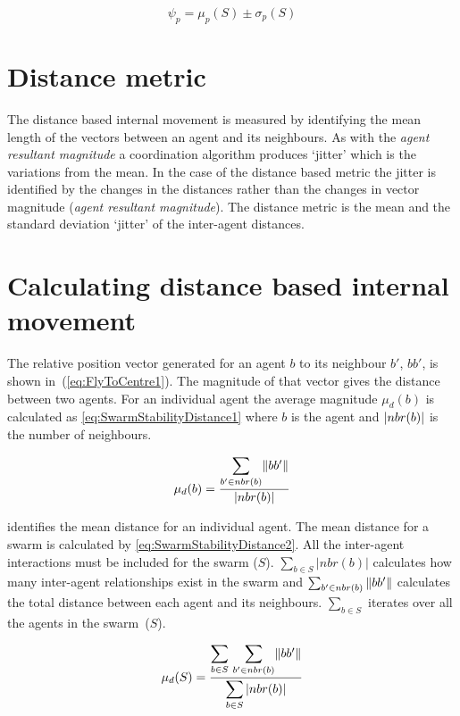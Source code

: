 \begin{equation}
\label{eq:SwarmPotentialMagnitude}
\psi_p = \mu_p(S)\pm \sigma_p(S)
\end{equation}

\section{Distance metric}
The distance based internal movement is measured by identifying the mean length of the vectors between an agent and its neighbours. As with the \textit{agent resultant magnitude} a coordination algorithm produces `jitter' which is the variations from the mean. In the case of the distance based metric the jitter is identified by the changes in the distances rather than the changes in vector magnitude (\textit{agent resultant magnitude}). The distance metric is the mean and the standard deviation `jitter' of the inter-agent distances.

\section{Calculating distance based internal movement}
The relative position vector generated for an agent $b$ to its neighbour $b'$, $bb'$, is shown in~(\autoref{eq:FlyToCentre1}). The magnitude of that vector gives the distance between two agents. For an individual agent the average magnitude $\mu_d(b)$ is calculated as \autoref{eq:SwarmStabilityDistance1} where $b$ is the agent and $\vert{nbr(b)}\vert$ is the number of neighbours.

\begin{equation}
\label{eq:SwarmStabilityDistance1}
\mu_d(b) = \frac{\mathlarger{\sum_{b' \in nbr(b)}}\magn{bb'}}{\mathlarger{\card{nbr(b)}}}
\end{equation}

\label{eq:SwarmStabilityDistance1} identifies the mean distance for an individual agent. The mean distance for a swarm is calculated by \autoref{eq:SwarmStabilityDistance2}. All the inter-agent interactions must be included for the swarm ($S$). $\sum_{b \in S}|nbr(b)|$ calculates how many inter-agent relationships exist in the swarm and $\sum_{b' \in nbr(b)}\Vert{bb'}\Vert$ calculates the total distance between each agent and its neighbours. $\sum_{b \in S}$ iterates over all the agents in the swarm~($S$).

\begin{equation}
\label{eq:SwarmStabilityDistance2}
\mu_d(S) = \frac{\mathlarger{\sum_{b \in S}}~\mathlarger{\sum_{b' \in nbr(b)}}\magn{bb'}}{\mathlarger{\sum_{b \in S}\card{nbr(b)}}}
\end{equation}

